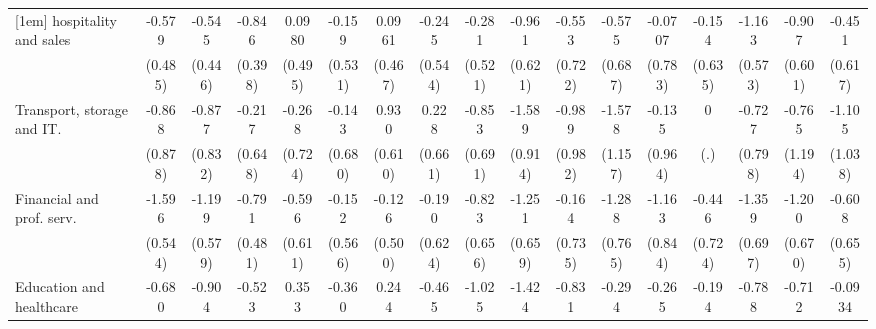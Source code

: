{\begin{tabular}{l*{16}{c}}
[1em]
hospitality and sales&      -0.579         &      -0.545         &      -0.846\sym{*}  &      0.0980         &      -0.159         &      0.0961         &      -0.245         &      -0.281         &      -0.961         &      -0.553         &      -0.575         &     -0.0707         &      -0.154         &      -1.163\sym{*}  &      -0.907         &      -0.451         \\
                    &     (0.485)         &     (0.446)         &     (0.398)         &     (0.495)         &     (0.531)         &     (0.467)         &     (0.544)         &     (0.521)         &     (0.621)         &     (0.722)         &     (0.687)         &     (0.783)         &     (0.635)         &     (0.573)         &     (0.601)         &     (0.617)         \\
[1em]
Transport, storage and IT.&      -0.868         &      -0.877         &      -0.217         &      -0.268         &      -0.143         &       0.930         &       0.228         &      -0.853         &      -1.589         &      -0.989         &      -1.578         &      -0.135         &           0         &      -0.727         &      -0.765         &      -1.105         \\
                    &     (0.878)         &     (0.832)         &     (0.648)         &     (0.724)         &     (0.680)         &     (0.610)         &     (0.661)         &     (0.691)         &     (0.914)         &     (0.982)         &     (1.157)         &     (0.964)         &         (.)         &     (0.798)         &     (1.194)         &     (1.038)         \\
[1em]
Financial and prof. serv.&      -1.596\sym{**} &      -1.199\sym{*}  &      -0.791         &      -0.596         &      -0.152         &      -0.126         &      -0.190         &      -0.823         &      -1.251         &      -0.164         &      -1.288         &      -1.163         &      -0.446         &      -1.359         &      -1.200         &      -0.608         \\
                    &     (0.544)         &     (0.579)         &     (0.481)         &     (0.611)         &     (0.566)         &     (0.500)         &     (0.624)         &     (0.656)         &     (0.659)         &     (0.735)         &     (0.765)         &     (0.844)         &     (0.724)         &     (0.697)         &     (0.670)         &     (0.655)         \\
[1em]
Education and healthcare&      -0.680         &      -0.904         &      -0.523         &       0.353         &      -0.360         &       0.244         &      -0.465         &      -1.025         &      -1.424\sym{*}  &      -0.831         &      -0.294         &      -0.265         &      -0.194         &      -0.788         &      -0.712         &     -0.0934         \\

\end{tabular}}
